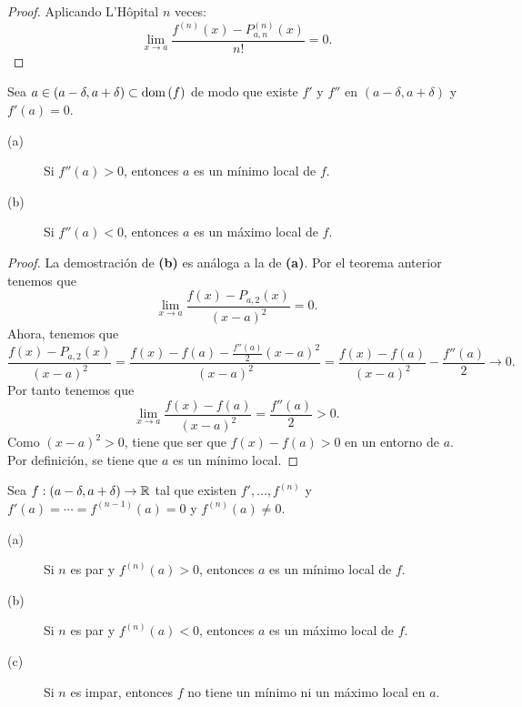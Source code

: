 \begin{proof}
Aplicando L'Hôpital $\displaystyle n $ veces:
\[ \lim_{x \to a}\frac{f^{\left(n\right) } \left(x\right)- P^{\left(n\right)}_{a,n}\left(x\right)}{n!} = 0 .\]
\end{proof}
\begin{fcolorary}[]
\normalfont Sea $\displaystyle a \in \left(a - \delta, a + \delta \right) \subset \operatorname{dom}\left(f\right) $ de modo que existe $\displaystyle f' $ y $\displaystyle f'' $ en $\displaystyle \left(a - \delta, a + \delta \right) $ y $\displaystyle f'\left(a\right) = 0 $.
\begin{description}
\item[(a)] Si $\displaystyle f''\left(a\right) > 0 $, entonces $\displaystyle a $ es un mínimo local de $\displaystyle f $.
\item[(b)] Si $\displaystyle f''\left(a\right) < 0 $, entonces $\displaystyle a $ es un máximo local de $\displaystyle f $.
\end{description}
\end{fcolorary}
\begin{proof}
La demostración de \textbf{(b)} es análoga a la de \textbf{(a)}. Por el teorema anterior tenemos que
\[\lim_{x \to a}\frac{f\left(x\right)-P_{a,2}\left(x\right)}{\left(x-a\right)^{2}} = 0 .\]
Ahora, tenemos que
\[\frac{f\left(x\right)-P_{a,2}\left(x\right)}{\left(x-a\right)^{2}} = \frac{f\left(x\right)-f\left(a\right)-\frac{f''\left(a\right)}{2}\left(x-a\right)^{2}}{\left(x-a\right)^{2}} = \frac{f\left(x\right)-f\left(a\right)}{\left(x-a\right)^{2}} -\frac{f''\left(a\right)}{2} \to 0.\]
Por tanto tenemos que 
\[\lim_{x \to a}\frac{f\left(x\right)-f\left(a\right)}{\left(x-a\right)^{2}} = \frac{f''\left(a\right)}{2} > 0 .\]
Como $\displaystyle \left(x-a\right)^{2} > 0 $, tiene que ser que $\displaystyle f\left(x\right) - f\left(a\right) > 0 $ en un entorno de $\displaystyle a $. Por definición, se tiene que $\displaystyle a $ es un mínimo local. 
\end{proof}
\begin{fcolorary}[]
\normalfont Sea $\displaystyle f : \left(a-\delta, a + \delta \right)\to \mathbb{R} $ tal que existen $\displaystyle f', \ldots, f^{\left(n\right)} $ y $\displaystyle f'\left(a\right) = \cdots = f^{\left(n-1\right)}\left(a\right) = 0$ y $\displaystyle f^{\left(n\right)}\left(a\right) \neq 0 $.
\begin{description}
\item[(a)] Si $\displaystyle n $ es par y $\displaystyle f^{\left(n\right)}\left(a\right) > 0 $, entonces $\displaystyle a $ es un mínimo local de $\displaystyle f $.
\item[(b)] Si $\displaystyle n $ es par y $\displaystyle f^{\left(n\right)}\left(a\right) < 0 $, entonces $\displaystyle a $ es un máximo local de $\displaystyle f $.
\item[(c)] Si $\displaystyle n $ es impar, entonces $\displaystyle f $ no tiene un mínimo ni un máximo local en $\displaystyle a $.
\end{description}
\end{fcolorary}
